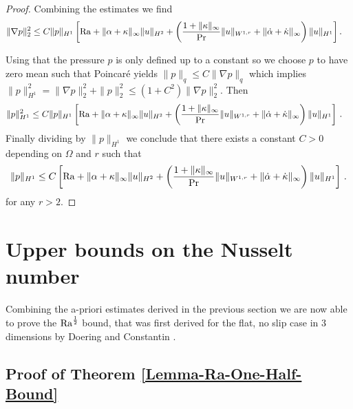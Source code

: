 \documentclass{article}
\newtheorem{lemma}[theorem]{Lemma}
\theoremstyle{definition}
\theoremstyle{definition}
\newcommand{\Pra}{\rm{Pr}}
\newcommand{\Ra}{{\rm{Ra}}}
\newcommand{\Nu}{{\rm{Nu}}}
\begin{document}
\begin{proof}
\smallskip 

Combining the estimates we find
\begin{align*}
     \| \nabla p\|_2^2 
     &\leq C \|p\|_{H^1}\left[ \Ra + \|\alpha+\kappa\|_\infty\|u\|_{H^2}+\left(\frac{1+\|\kappa\|_\infty}{\Pra}\|u\|_{W^{1,r}}+\|\dot\alpha+\dot\kappa\|_\infty \right)\|u\|_{H^1}\right].
\end{align*}

Using that the pressure $p$ is only defined up to a constant so we choose $p$ to have zero mean such that Poincaré yields $\|p\|_q\leq C \|\nabla p\|_q$ which implies $\|p\|_{H^1}^2 = \|\nabla p\|_2^2+\|p\|_2^2 \leq (1+C^2) \|\nabla p\|_2^2$. Then 
\begin{align*}
    \| p\|_{H^1}^2
    &\leq C \| p\|_{H^1}\left[ \Ra + \|\alpha+\kappa\|_\infty\|u\|_{H^2}+\left(\frac{1+\|\kappa\|_\infty}{\Pra}\|u\|_{W^{1,r}}+\|\dot\alpha+\dot\kappa\|_\infty \right)\|u\|_{H^1}\right]\,.
\end{align*}
Finally dividing by $\| p\|_{H^1}$ we conclude that there exists a constant $C>0$ depending on $\Omega$ and $r$ such that
\begin{eqnarray*}
    \| p\|_{H^1}
    \leq C\left[ \Ra + \|\alpha+\kappa\|_\infty\|u\|_{H^2}+\left(\frac{1+\|\kappa\|_\infty}{\Pra}\|u\|_{W^{1,r}}+\|\dot\alpha+\dot\kappa\|_\infty \right)\|u\|_{H^1}\right]\,.
\end{eqnarray*}
for any $r>2$.
\end{proof}








\section{Upper bounds on the Nusselt number}\label{section-four}
Combining the a-priori estimates derived in the previous section we are now able to prove the $\Ra^\frac{1}{2}$ bound, that was first derived for the flat, no slip case in 3 dimensions by Doering and Constantin \cite{DC96}.
\subsection{Proof of Theorem \ref{Lemma-Ra-One-Half-Bound}}
\end{document}
